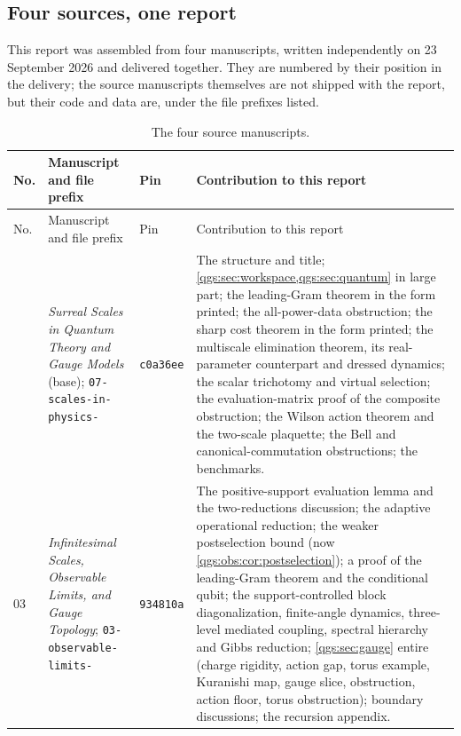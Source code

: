 \documentclass[11pt,oneside]{article}
\numberwithin{equation}{section}
\theoremstyle{plain}
\theoremstyle{definition}
\theoremstyle{remark}
\begin{document}
\subsection{Four sources, one report}\label{qgs:sec:provenance}
This report was assembled from four manuscripts, written independently on 23 September 2026 and delivered together. They are numbered by their position in the delivery; the source manuscripts themselves are not shipped with the report, but their code and data are, under the file prefixes listed.

\begin{longtable}{@{}L{0.05\textwidth}L{0.27\textwidth}L{0.09\textwidth}L{0.49\textwidth}@{}}
\caption{The four source manuscripts.}\label{qgs:tab:sources}\\
\toprule
No. & Manuscript and file prefix & Pin & Contribution to this report\\
\midrule
\endfirsthead
\toprule
No. & Manuscript and file prefix & Pin & Contribution to this report\\
\midrule
\endhead
\bottomrule
{} & \emph{Surreal Scales in Quantum Theory and Gauge Models} (base); \nolinkurl{07-scales-in-physics-} & \texttt{c0a36ee} & The structure and title; \cref{qgs:sec:workspace,qgs:sec:quantum} in large part; the leading-Gram theorem in the form printed; the all-power-data obstruction; the sharp cost theorem in the form printed; the multiscale elimination theorem, its real-parameter counterpart and dressed dynamics; the scalar trichotomy and virtual selection; the evaluation-matrix proof of the composite obstruction; the Wilson action theorem and the two-scale plaquette; the Bell and canonical-commutation obstructions; the benchmarks.\\[3pt]
03 & \emph{Infinitesimal Scales, Observable Limits, and Gauge Topology}; \nolinkurl{03-observable-limits-} & \texttt{934810a} & The positive-support evaluation lemma and the two-reductions discussion; the adaptive operational reduction; the weaker postselection bound (now \cref{qgs:obs:cor:postselection}); a proof of the leading-Gram theorem and the conditional qubit; the support-controlled block diagonalization, finite-angle dynamics, three-level mediated coupling, spectral hierarchy and Gibbs reduction; \cref{qgs:sec:gauge} entire (charge rigidity, action gap, torus example, Kuranishi map, gauge slice, obstruction, action floor, torus obstruction); boundary discussions; the recursion appendix.\\[3pt]

\end{longtable}
\end{document}
